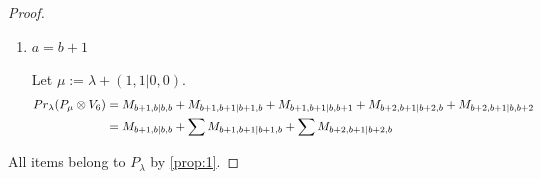 \begin{proof}
\begin{enumerate}
        \item $a = b+1$ \par
        Let $\mu:=\lambda + (1,1|0,0) $.
        \begin{equation}\notag
          \begin{aligned}
            Pr_{\lambda}(P_\mu \otimes V_{6}) &=
M_{b+1,b|b,b}
+ M_{b+1,b+1|b+1,b}
+ M_{b+1,b+1|b,b+1}
+ M_{b+2,b+1|b+2,b}
+ M_{b+2,b+1|b,b+2} \\
                                               &=
 M_{b+1,b|b,b}
+ \sum M_{b+1,b+1|b+1,b}
+ \sum M_{b+2,b+1|b+2,b}
          \end{aligned}
        \end{equation}
  \end{enumerate}
All items belong to $P_\lambda$ by \cref{prop:1}.
\end{proof}


